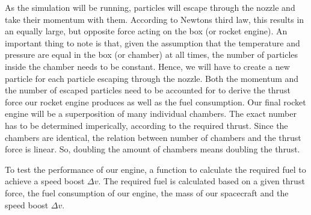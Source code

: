 \documentclass[reprint,english,notitlepage]{revtex4-2}
\begin{document}
As the simulation will be running, particles will escape through the nozzle and take their momentum with them.
According to Newtons third law, this results in an equally large, but opposite force acting on the box (or rocket engine).
An important thing to note is that, given the assumption that the temperature and pressure are equal in the box (or chamber) at all times, the number of particles inside the chamber needs to be constant.
Hence, we will have to create a new particle for each particle escaping through the nozzle.
Both the momentum and the number of escaped particles need to be accounted for to derive the thrust force our rocket engine produces as well as the fuel consumption.
Our final rocket engine will be a superposition of many individual chambers. The exact number has to be determined imperically, according to the required thrust.
Since the chambers are identical, the relation between number of chambers and the thrust force is linear.
So, doubling the amount of chambers means doubling the thrust.

To test the performance of our engine, a function to calculate the required fuel to achieve a speed boost $\Delta v$.
The required fuel is calculated based on a given thrust force, the fuel consumption of our engine, the mass of our spacecraft and the speed boost $\Delta v$.
\end{document}
